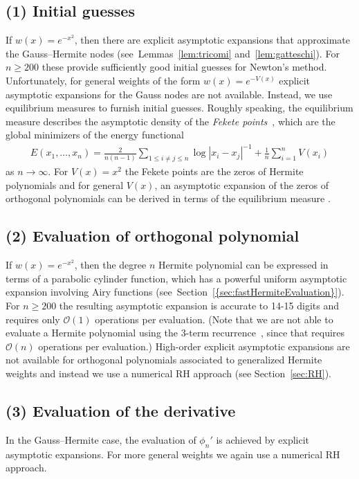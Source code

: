 \documentclass[final]{siamltex}
\begin{document}
\subsection*{(1) Initial guesses}
If $w(x)=e^{-x^2}$, then there are explicit asymptotic expansions that approximate 
the Gauss--Hermite nodes (see~Lemmas~\ref{lem:tricomi} and~\ref{lem:gatteschi}). For $n\geq 200$ these provide sufficiently good  
initial guesses for Newton's method. Unfortunately, for general weights of the form 
$w(x) = e^{-V(x)}$ explicit asymptotic expansions for the Gauss nodes are not available. 
Instead, we use equilibrium measures to furnish initial guesses.  Roughly speaking, the 
equilibrium measure describes the asymptotic density of the \emph{Fekete points}~\cite{SaffPotential}, 
which are the global minimizers of the energy functional
\begin{align*}
E(x_1,\ldots,x_n) = \frac{2}{n(n-1)} \sum_{1 \leq i \neq j \leq n} \log |x_i- x_j|^{-1} + \frac{1}{n} \sum_{i=1}^n V(x_i)
\end{align*}  
as $n \rightarrow \infty$. For $V(x) = x^2$ the Fekete points are the zeros of Hermite polynomials and for general $V(x)$, 
an asymptotic expansion of the zeros of orthogonal polynomials can be derived in terms of the equilibrium measure \cite{DKMVZ}. 

\subsection*{(2) Evaluation of orthogonal polynomial}
If $w(x)=e^{-x^2}$, then the degree $n$ Hermite polynomial can be expressed in terms of a parabolic 
cylinder function, which has a powerful uniform asymptotic expansion involving Airy functions (see~{Section~\ref{{sec:fastHermiteEvaluation}}}). For $n\geq 200$ the resulting asymptotic expansion
is accurate to 14-15 digits and requires only $\mathcal{O}(1)$ operations per evaluation. (Note that we are not able 
to evaluate a Hermite polynomial using the $3$-term recurrence~\cite[(18.9.1)]{NISTHandbook}, since that requires $\mathcal{O}(n)$ operations per 
evaluation.) High-order explicit asymptotic expansions are not available
for orthogonal polynomials associated to generalized Hermite 
weights and instead we use a numerical RH approach (see Section~\ref{sec:RH}).  

\subsection*{(3) Evaluation of the derivative}
In the Gauss--Hermite case, the evaluation of $\phi_n'$ is achieved 
by explicit asymptotic expansions. For more general weights we 
again use a numerical RH approach.
\end{document}

